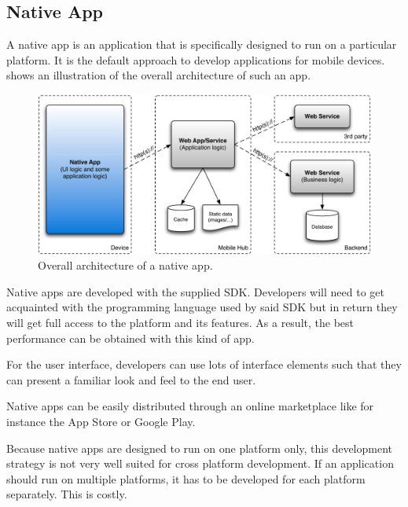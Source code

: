 
\subsection{Native App}

A native app is an application that is specifically designed to run on a particular platform. It is the default approach to develop applications for mobile devices.  shows an illustration of the overall architecture of such an app. 

\begin{figure}[h!]
    \begin{center}
        \includegraphics[width=\textwidth]{figs/native.pdf}
        \caption{
            Overall architecture of a native app. 
        }
        \label{fig:native}
    \end{center}
\end{figure}

\npar Native apps are developed with the supplied SDK. Developers will need to get acquainted with the programming language used by said SDK but in return they will get full access to the platform and its features. As a result, the best performance can be obtained with this kind of app.

\npar For the user interface, developers can use lots of interface elements such that they can present a familiar look and feel to the end user. 

\npar Native apps can be easily distributed through an online marketplace like for instance the App Store or Google Play. 

\npar Because native apps are designed to run on one platform only, this development strategy is not very well suited for cross platform development. If an application should run on multiple platforms, it has to be developed for each platform separately. This is costly.

